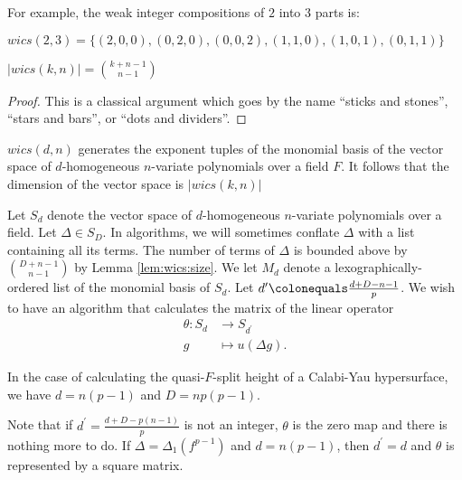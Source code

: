 For example, the weak integer compositions of $2$ into $3$ parts is:
\begin{center}
    $wics(2, 3) = \lbrace (2, 0, 0), (0, 2, 0), (0, 0, 2), (1, 1, 0), (1, 0, 1), (0, 1, 1) \rbrace$
\end{center}

\begin{lem}
    \label{lem:wics:size}
    $|wics(k, n)| = \binom{k + n - 1}{n - 1}$
\end{lem}

\begin{proof}
	This is a classical argument which goes by the name ``sticks and stones'', ``stars and bars'', or ``dots and dividers''.
\end{proof}

\begin{rmk}
    $wics(d, n)$ generates the exponent tuples of the monomial basis of the vector space of $d$-homogeneous $n$-variate polynomials over a field $F$.
    It follows that the dimension of the vector space is $|wics(k, n)|$
\end{rmk}

\begin{cxt}
	\label{cxt:mult:split}
	Let $S_d$ denote the vector space of $d$-homogeneous $n$-variate polynomials over a field.
    Let \(\Delta \in S_D\).
	In algorithms, we will sometimes conflate \(\Delta\) 
	with a list containing all its terms.
	The number of terms of \(\Delta\) is bounded 
	above by \(\binom{D+n-1}{n-1}\) by Lemma \ref{lem:wics:size}.
	We let \(M_{d}\) denote a lexographically-ordered list
	of the monomial basis of \(S_{d}\).
	Let \(d^{\prime} \colonequals \frac{d+D-n-1}{p}\).
	We wish to have an algorithm that calculates the matrix of
	the linear operator
	\begin{align*}
		\theta : S_{d} &\longrightarrow S_{d^{\prime}} \\
		g &\longmapsto u(\Delta g)
	.\end{align*}
\end{cxt}

In the case of calculating the quasi-\(F\)-split height of a Calabi-Yau
hypersurface,
we have \(d = n(p-1)\) and \(D = np(p-1)\).

\begin{rmk}
	Note that if  \(d^{\prime} = \frac{d+D-p(n-1)}{p}\)
	is not an integer, \(\theta\) is the zero map
	and there is nothing more to do. 
    If \(\Delta = \Delta_{1}(f^{p-1})\) and \(d = n(p-1)\),
	then \(d^{\prime} = d\) and \(\theta\) is
	represented by
	a square matrix.
\end{rmk}

